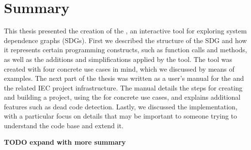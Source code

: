 \chapter{Summary} \label{ch:summary}

This thesis presented the creation of the \SB, an interactive tool for exploring system dependence graphs (SDGs). First 
we described the structure of the SDG and how it represents certain programming constructs, such as function calls and 
methods, as well as the additions and simplifications applied by the tool. The tool was created with four concrete use 
cases in mind, which we discussed by means of examples. The next part of the thesis was written as a user's manual for 
the \SB and the related IEC project infrastructure. The manual details the steps for creating and building a project, 
using the \SB for concrete use cases, and explains additional features such as dead code detection. Lastly, we 
discussed the implementation, with a particular focus on details that may be important to someone trying to understand 
the \SB code base and extend it.

\textbf{TODO expand with more summary}
